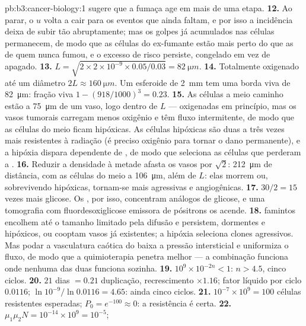 \begin{solution}{pb:b3:cancer-biology:1}
sugere que a fumaça age em mais de uma etapa.
\textbf{12.} Ao parar, o $u$ volta a cair para os eventos que ainda
faltam, e por isso a incidência deixa de subir tão abruptamente; mas os
golpes já acumulados nas células permanecem, de modo que as células do
ex-fumante estão mais perto do  que as de quem nunca fumou, e o
excesso de risco persiste, congelado em vez de apagado.
\textbf{13.} $L = \sqrt{2\times 2\times 10^{-9}\times 0.05/0.03} =
\qty{82}{\micro m}$.
\textbf{14.} Totalmente oxigenado até um diâmetro $2L \approx
\qty{160}{\micro m}$. Um esferoide de \qty{2}{mm} tem uma borda viva de
\qty{82}{\micro m}: fração viva $1 - (918/1000)^{3} = 0.23$.
\textbf{15.} As células a meio caminho estão a \qty{75}{\micro m} de um
vaso, logo dentro de $L$ --- oxigenadas em princípio, mas os vasos
tumorais carregam menos oxigênio e têm fluxo intermitente, de modo que
as células do meio ficam hipóxicas. As células hipóxicas são duas a três
vezes mais resistentes à radiação (é preciso oxigênio para tornar o dano
permanente), e a hipóxia dispara  dependente de , de modo que
seleciona as células que perderam a .
\textbf{16.} Reduzir a densidade à metade afasta os vasos por
$\sqrt{2}$: \qty{212}{\micro m} de distância, com as células do meio a
\qty{106}{\micro m}, além de $L$: elas morrem ou, sobrevivendo
hipóxicas, tornam-se mais agressivas e angiogênicas.
\textbf{17.} $30/2 = 15$ vezes mais glicose. Os , por isso,
concentram análogos de glicose, e uma tomografia com
fluordesoxiglicose emissora de pósitrons os acende.
\textbf{18.}  famintos encolhem até o tamanho limitado pela
difusão e persistem, dormentes e hipóxicos, ou cooptam vasos já
existentes; a hipóxia seleciona clones agressivos. Mas podar a
vasculatura caótica do  baixa a pressão intersticial e uniformiza o
fluxo, de modo que a quimioterapia penetra melhor --- a combinação
funciona onde nenhuma das duas funciona sozinha.
\textbf{19.} $10^{9}\times 10^{-2n} < 1$: $n > 4.5$, cinco ciclos.
\textbf{20.} $21$ dias $= 0.21$ duplicação, recrescimento $\times 1.16$;
fator líquido por ciclo $0.0116$; $\ln 10^{-9}/\ln 0.0116 = 4.65$: ainda
cinco ciclos.
\textbf{21.} $10^{-7}\times 10^{9} = 100$ células resistentes esperadas;
$P_{0} = e^{-100} \approx 0$: a resistência é certa.
\textbf{22.} $\mu_{1}\mu_{2}N = 10^{-14}\times 10^{9} = 10^{-5}$;

\end{solution}
